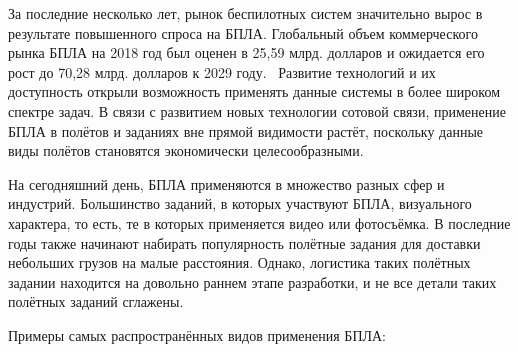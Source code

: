 \documentclass[specification,annotation]{itmo-student-thesis}
\begin{document}
За последние несколько лет, рынок беспилотных систем значительно вырос в
результате повышенного спроса на БПЛА. Глобальный объем коммерческого рынка БПЛА
на 2018 год был оценен в 25,59 млрд. долларов и ожидается его рост до 70,28
млрд. долларов к 2029 году.~\cite{bloomberg-uav-market} Развитие технологий и их
доступность открыли возможность применять данные системы в более широком спектре
задач. В связи с развитием новых технологии сотовой связи, применение БПЛА в
полётов и заданиях вне прямой видимости растёт, поскольку данные виды полётов
становятся экономически целесообразными.

На сегодняшний день, БПЛА применяются в множество разных сфер и индустрий.
Большинство заданий, в которых участвуют БПЛА, визуального характера, то есть,
те в которых применяется видео или фотосъёмка. В последние годы также начинают
набирать популярность полётные задания для доставки небольших грузов на малые
расстояния. Однако, логистика таких полётных задании находится на довольно раннем
этапе разработки, и не все детали таких полётных заданий сглажены.

Примеры самых распространённых видов применения БПЛА:
\end{document}
